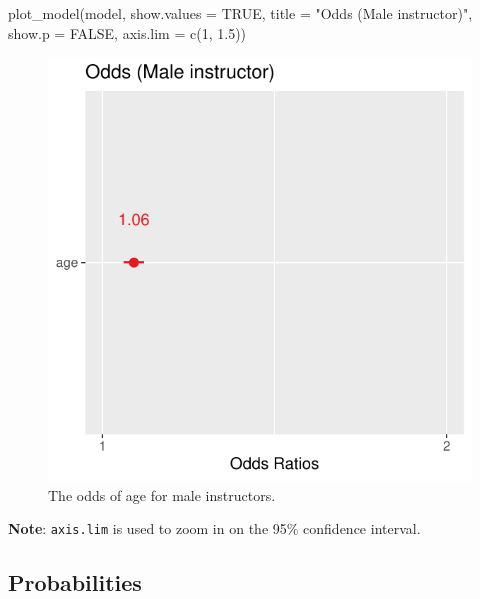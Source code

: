 \documentclass[
  letterpaper,
  DIV=11,
  numbers=noendperiod]{scrartcl}
\newenvironment{Shaded}{\begin{snugshade}}{\end{snugshade}}
\newcommand{\AttributeTok}[1]{\textcolor[rgb]{0.40,0.45,0.13}{#1}}
\newcommand{\ConstantTok}[1]{\textcolor[rgb]{0.56,0.35,0.01}{#1}}
\newcommand{\DecValTok}[1]{\textcolor[rgb]{0.68,0.00,0.00}{#1}}
\newcommand{\FloatTok}[1]{\textcolor[rgb]{0.68,0.00,0.00}{#1}}
\newcommand{\FunctionTok}[1]{\textcolor[rgb]{0.28,0.35,0.67}{#1}}
\newcommand{\NormalTok}[1]{\textcolor[rgb]{0.00,0.23,0.31}{#1}}
\newcommand{\StringTok}[1]{\textcolor[rgb]{0.13,0.47,0.30}{#1}}
\begin{document}
\begin{Shaded}
\begin{Highlighting}[]
\FunctionTok{plot\_model}\NormalTok{(model, }\AttributeTok{show.values =} \ConstantTok{TRUE}\NormalTok{,}
           \AttributeTok{title =} \StringTok{"Odds (Male instructor)"}\NormalTok{, }\AttributeTok{show.p =} \ConstantTok{FALSE}\NormalTok{, }\AttributeTok{axis.lim =} \FunctionTok{c}\NormalTok{(}\DecValTok{1}\NormalTok{, }\FloatTok{1.5}\NormalTok{))}
\end{Highlighting}
\end{Shaded}

\begin{figure}[H]

{\centering \includegraphics{index_files/figure-pdf/unnamed-chunk-22-1.pdf}

}

\caption{The odds of age for male instructors.}

\end{figure}%

\textbf{Note}: \texttt{axis.lim} is used to zoom in on the 95\%
confidence interval.

\subsection{Probabilities}\label{probabilities}
\end{document}
